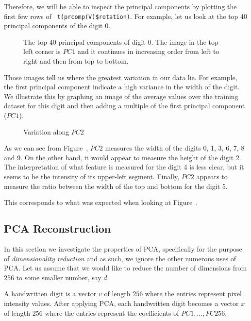 \documentclass[12pt,article,oneside]{memoir}
\newcommand{\func}[1]{\texttt{\color{red} #1}}
\begin{document}
Therefore, we will be able to inspect the principal components by plotting the first few rows of \func{t(prcomp(V)\$rotation)}. For example, let us look at the top 40 principal components of the digit $0$.
\begin{figure}[H]
	\caption{The top 40 principal components of digit 0. The image in the top-left corner is $PC1$ and it continues in increasing order from left to right and then from top to bottom.}
	\label{fig:top-pcs-digit-0}
\end{figure}

Those images tell us where the greatest variation in our data lie. For example, the first principal component indicate a high variance in the width of the digit. We illustrate this by graphing an image of the average values over the training dataset for this digit and then adding a multiple of the first principal component ($PC1$).

\begin{figure}[H]
	\caption{Variation along $PC2$}
	\label{fig:pc-2}
\end{figure}

As we can see from Figure~\label{fig:pc-2}, $PC2$ measures the width of the digits 0, 1, 3, 6, 7, 8 and 9. On the other hand, it would appear to measure the height of the digit 2. The interpretation of what feature is measured for the digit 4 is less clear, but it seems to be the intensity of its upper-left segment. Finally, $PC2$ appears to measure the ratio between the width of the top and bottom for the digit 5.

This corresponds to what was expected when looking at Figure~\label{fig:top-pcs-digit-0}.

\subsection{PCA Reconstruction}

In this section we investigate the properties of PCA, specifically for the purpose of \emph{dimensionality reduction} and as such, we ignore the other numerous uses of PCA. Let us assume that we would like to reduce the number of dimensions from 256 to some smaller number, say $d$.

A handwritten digit is a vector $v$ of length $256$ where the entries represent pixel intensity values. After applying PCA, each handwritten digit becomes a vector $x$ of length $256$ where the entries represent the coefficients of $PC1, \ldots, PC256$.
\end{document}
